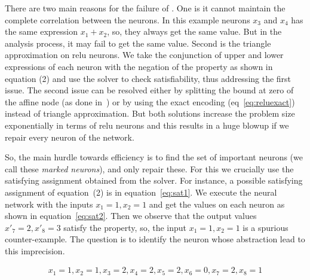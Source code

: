 There are two main reasons for the failure of \deeppoly{}. One is it cannot maintain the complete correlation 
between the neurons. In this example neurons $x_3$ and $x_4$ has the same expression $x_1+x_2$, so, they always
get the same value. But in the \deeppoly{} analysis process, it may fail to get the same value. Second is the triangle
approximation on relu neurons.
We take the conjunction of upper and lower expressions of each neuron with the negation of the property
as shown in equation (2)%
and use the \milp{} solver to check satisfiability, thus addressing the first issue.  The second issue can be resolved either by splitting the bound at zero of the affine node (as done in~\cite{?}) or by using the exact encoding (eq~\ref{eq:reluexact}) instead of triangle approximation. But both solutions increase the problem size exponentially in terms of relu neurons and this results in a huge blowup if we repair every neuron of the network. 

So, the main hurdle towards efficiency is to find the set of important neurons (we call these {\em marked neurons}), and only repair these.  For this we crucially use the satisfying assignment obtained from the \milp{} solver.
For instance, a possible satisfying assignment of equation~(2)%
is in equation~\ref{eq:sat1}. We execute the neural network with the inputs $x_1=1,x_2=1$ and get the values on each neuron as shown in equation~\ref{eq:sat2}. Then we observe that the output values $x'_7=2, x'_8=3$ satisfy the property, so, the input $x_1=1, x_2=1$ is a spurious counter-example. The question is to identify the neuron whose abstraction lead to this imprecision. 


 \setcounter{equation}{2}
\begin{equation}
    \begin{aligned}
        x_1=1, x_2=1, x_3=2, x_4=2, x_5=2, x_6=0, x_7=2, x_8=1
    \end{aligned}
\label{eq:sat1}
\end{equation}

